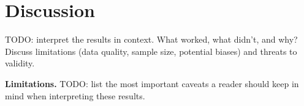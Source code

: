 \section{Discussion}
\label{sec:discussion}

TODO: interpret the results in context. What worked, what didn't, and why?
Discuss limitations (data quality, sample size, potential biases) and
threats to validity.

\begin{notebox}
\textbf{Limitations.} TODO: list the most important caveats a reader should
keep in mind when interpreting these results.
\end{notebox}

